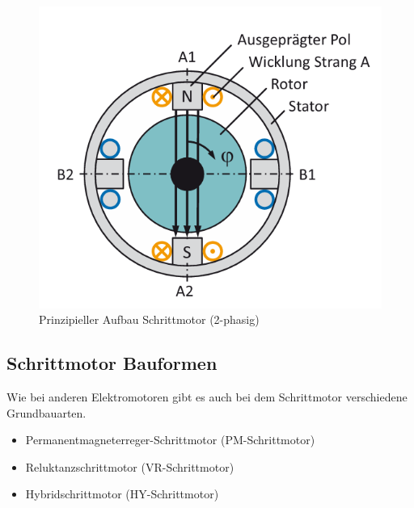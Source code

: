 \begin{figure}[H]
	\begin{center}
		\includegraphics[width=\textwidth]{Images/PrinzipSchritmotor.png}
		\caption{Prinzipieller Aufbau Schrittmotor (2-phasig) \cite{Hagl.2021}} \label{HaPrSchritt}
	\end{center}
\end{figure}

\subsection{Schrittmotor Bauformen}

Wie bei anderen Elektromotoren gibt es auch bei dem Schrittmotor verschiedene Grundbauarten. 

\begin{itemize}
	\item {Permanentmagneterreger-Schrittmotor (PM-Schrittmotor)}
	\item {Reluktanzschrittmotor (VR-Schrittmotor)}
	\item {Hybridschrittmotor (HY-Schrittmotor)}
\end{itemize}

